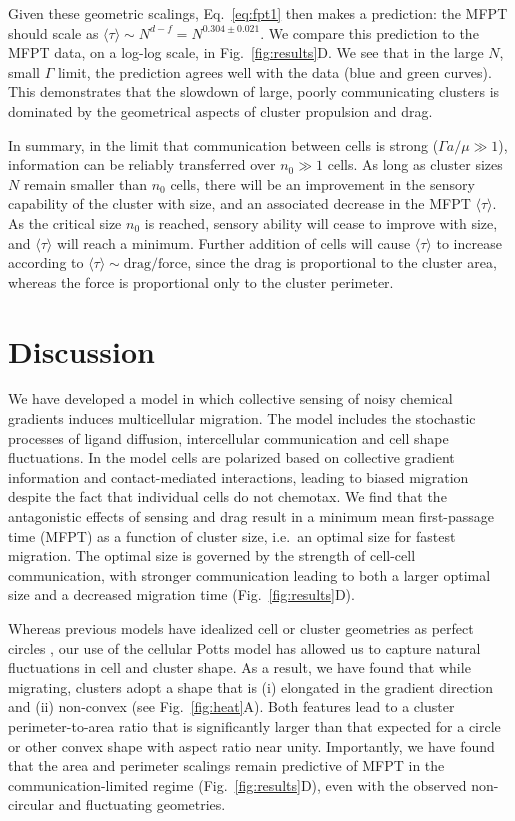 Given these geometric scalings, Eq.\ \ref{eq:fpt1} then makes a prediction: the MFPT should scale as $\langle\tau\rangle \sim N^{d-f} = N^{0.304 \pm 0.021}$. We compare this prediction to the MFPT data, on a log-log scale, in Fig.\ \ref{fig:results}D. We see that in the large $N$, small $\Gamma$ limit, the prediction agrees well with the data (blue and green curves). This demonstrates that the slowdown of large, poorly communicating clusters is dominated by the geometrical aspects of cluster propulsion and drag.

In summary, in the limit that communication between cells is strong ($\Gamma a / \mu \gg 1$), information can be reliably transferred over $n_0 \gg 1$ cells. As long as cluster sizes $N$ remain smaller than $n_0$ cells, there will be an improvement in the sensory capability of the cluster with size, and an associated decrease in the MFPT $\langle\tau\rangle$.  As the critical size $n_0$ is reached, sensory ability will cease to improve with size, and $\langle\tau\rangle$ will reach a minimum. Further addition of cells will cause $\langle\tau\rangle$ to increase according to
$\langle\tau\rangle \sim \text{drag}/\text{force}$, since the drag is proportional to the cluster area, whereas the force is proportional only to the cluster perimeter.


\section{Discussion}

We have developed a model in which collective sensing of noisy chemical gradients induces multicellular migration. The model includes the stochastic processes of ligand diffusion, intercellular communication and cell shape fluctuations.
In the model cells are polarized based on collective gradient information and contact-mediated interactions, leading to biased migration despite the fact that individual cells do not chemotax. We find that the antagonistic effects of sensing and drag result in a minimum mean first-passage time (MFPT) as a function of cluster size, i.e.\ an optimal size for fastest migration. The optimal size is governed by the strength of cell-cell communication, with stronger communication leading to both a larger optimal size and a decreased migration time (Fig.\ \ref{fig:results}D).

Whereas previous models have idealized cell or cluster geometries as perfect circles \cite{ camley2016emergent, camley2015collective}, our use of the cellular Potts model has allowed us to capture natural fluctuations in cell and cluster shape. As a result, we have found that while migrating, clusters adopt a shape that is (i) elongated in the gradient direction and (ii) non-convex (see Fig.\ \ref{fig:heat}A). Both features lead to a cluster perimeter-to-area ratio that is significantly larger than that expected for a circle or other convex shape with aspect ratio near unity. Importantly, we have found that the area and perimeter scalings remain predictive of MFPT in the communication-limited regime (Fig.\ \ref{fig:results}D), even with the observed non-circular and fluctuating geometries.

